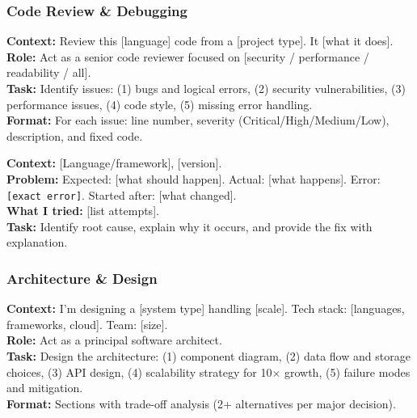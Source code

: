 \documentclass[11pt, a4paper, oneside]{report}
\begin{document}
\subsubsection{Code Review \& Debugging}

\begin{promptbox}[title={Template: Code Review}]
\textbf{Context:} Review this [language] code from a [project type]. It [what it does].\\[4pt]
\textbf{Role:} Act as a senior code reviewer focused on [security / performance / readability / all].\\[4pt]
\textbf{Task:} Identify issues: (1) bugs and logical errors, (2) security vulnerabilities, (3) performance issues, (4) code style, (5) missing error handling.\\[4pt]
\textbf{Format:} For each issue: line number, severity (Critical/High/Medium/Low), description, and fixed code.
\end{promptbox}

\begin{promptbox}[title={Template: Debugging}]
\textbf{Context:} [Language/framework], [version].\\[4pt]
\textbf{Problem:} Expected: [what should happen]. Actual: [what happens]. Error: \texttt{[exact error]}. Started after: [what changed].\\[4pt]
\textbf{What I tried:} [list attempts].\\[4pt]
\textbf{Task:} Identify root cause, explain why it occurs, and provide the fix with explanation.
\end{promptbox}

\subsubsection{Architecture \& Design}

\begin{promptbox}[title={Template: Architecture Design}]
\textbf{Context:} I'm designing a [system type] handling [scale]. Tech stack: [languages, frameworks, cloud]. Team: [size].\\[4pt]
\textbf{Role:} Act as a principal software architect.\\[4pt]
\textbf{Task:} Design the architecture: (1) component diagram, (2) data flow and storage choices, (3) API design, (4) scalability strategy for 10$\times$ growth, (5) failure modes and mitigation.\\[4pt]
\textbf{Format:} Sections with trade-off analysis (2+ alternatives per major decision).
\end{promptbox}
\end{document}
